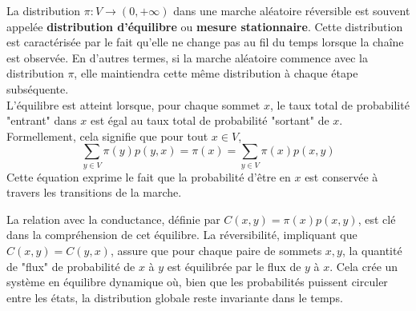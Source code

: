 \documentclass{article}
\theoremstyle{pasdepoint}
\theoremstyle{break}
\theoremstyle{pasdepoint}
\begin{document}
La distribution \(\pi : V \rightarrow (0, +\infty)\) dans une marche aléatoire réversible est souvent appelée \textbf{distribution d'équilibre} ou \textbf{mesure stationnaire}. Cette distribution est caractérisée par le fait qu'elle ne change pas au fil du temps lorsque la chaîne est observée. En d'autres termes, si la marche aléatoire commence avec la distribution \(\pi\), elle maintiendra cette même distribution à chaque étape subséquente.\\

L'équilibre est atteint lorsque, pour chaque sommet \(x\), le taux total de probabilité "entrant" dans \(x\) est égal au taux total de probabilité "sortant" de \(x\). Formellement, cela signifie que pour tout \(x \in V\),
\[
\sum_{y \in V} \pi(y)p(y, x) = \pi(x) = \sum_{y \in V} \pi(x)p(x, y)
\]
Cette équation exprime le fait que la probabilité d'être en \(x\) est conservée à travers les transitions de la marche. 

La relation avec la conductance, définie par \(C(x, y) = \pi(x)p(x, y)\), est clé dans la compréhension de cet équilibre. La réversibilité, impliquant que \(C(x, y) = C(y, x)\), assure que pour chaque paire de sommets \(x, y\), la quantité de "flux" de probabilité de \(x\) à \(y\) est équilibrée par le flux de \(y\) à \(x\). Cela crée un système en équilibre dynamique où, bien que les probabilités puissent circuler entre les états, la distribution globale reste invariante dans le temps.
\end{document}
